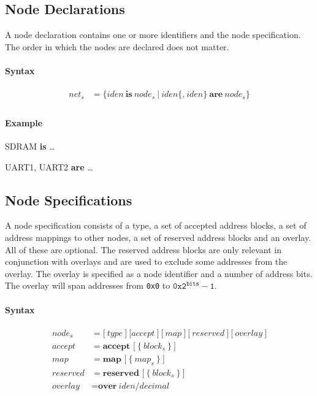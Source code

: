 \documentclass[a4paper,11pt,twoside]{report}
\begin{document}
{{{\subsection{Node Declarations}
A node declaration contains one or more identifiers and the node specification.
The order in which the nodes are declared does not matter.

\paragraph{Syntax}
\begin{align*}
\textit{net}_s & \mathop{=}
    \Big\{
        \textit{iden}\ \textbf{is}\ \textit{node}_s\
    \Big|\
        \textit{iden}\bigl\{\textbf{,}\ \textit{iden}\bigr\}\ \textbf{are}\ \textit{node}_s
    \Big\} \\
\end{align*}

\clearpage
\paragraph{Example}
\begin{syntax}
    SDRAM \textbf{is} \ldots

    UART1,
    UART2 \textbf{are} \ldots
\end{syntax}

\subsection{Node Specifications}
A node specification consists of a type, a set of accepted address blocks, a set of address mappings to other nodes, a set of reserved address blocks and an overlay.
All of these are optional.
The reserved address blocks are only relevant in conjunction with overlays and are used to exclude some addresses from the overlay.
The overlay is specified as a node identifier and a number of address bits.
The overlay will span addresses from \texttt{0x0} to \(\texttt{0x2}^\texttt{bits} - \texttt{1}\).

\paragraph{Syntax}
\begin{align*}
\textit{node}_s & \mathop{=}
    \Big[\ 
       \textit{type}\ 
    \Big]\  
    \Big[
       \textit{accept}\ 
    \Big]\ 
    \Big[\ 
       \textit{map}\ 
    \Big]\ 
    \Big[\ 
        \textit{reserved}\ 
    \Big]\ 
    \Big[\ 
        \textit{overlay}\ 
    \Big]\\
\textit{accept} & \mathop{=}
    \textbf{accept [}\ \big\{\ \textit{block}_s\ \big\}\ \textbf{]}\\
\textit{map} & \mathop{=}
    \textbf{map [}\ \big\{\ \textit{map}_s\ \big\}\ \textbf{]}\\
\textit{reserved} & \mathop{=}
    \textbf{reserved [}\ \big\{\ \textit{block}_s\ \big\}\ \textbf{]}\\
\textit{overlay} & \mathop{=}
    \textbf{over}\ \textit{iden}\textbf{/}\textit{decimal}\\
\end{align*}

}}}
\end{document}
